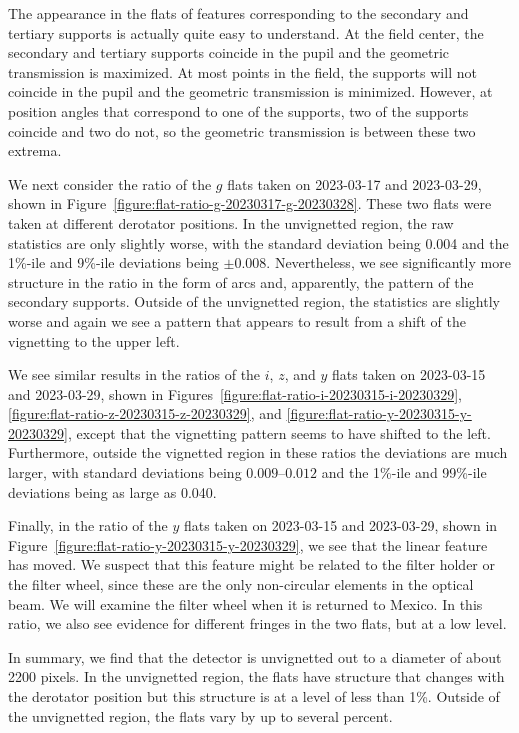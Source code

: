 \documentclass{article}
\begin{document}
The appearance in the flats of features corresponding to the secondary and tertiary supports is actually quite easy to understand. At the field center, the secondary and tertiary supports coincide in the pupil and the geometric transmission is maximized. At most points in the field, the supports will not coincide in the pupil and the geometric transmission is minimized. However, at position angles that correspond to one of the supports, two of the supports coincide and two do not, so the geometric transmission is between these two extrema.

We next consider the ratio of the $g$ flats taken on 2023-03-17 and 2023-03-29, shown in Figure~\ref{figure:flat-ratio-g-20230317-g-20230328}. These two flats were taken at different derotator positions. In the unvignetted region, the raw statistics are only slightly worse, with the standard deviation being 0.004 and the 1\%-ile and 9\%-ile deviations being $\pm0.008$. Nevertheless, we see significantly more structure in the ratio in the form of arcs and, apparently, the pattern of the secondary supports. Outside of the unvignetted region, the statistics are slightly worse and again we see a pattern that appears to result from a shift of the vignetting to the upper left.

We see similar results in the ratios of the $i$, $z$, and $y$ flats taken on 2023-03-15 and 2023-03-29, shown in Figures~\ref{figure:flat-ratio-i-20230315-i-20230329}, \ref{figure:flat-ratio-z-20230315-z-20230329}, and \ref{figure:flat-ratio-y-20230315-y-20230329}, except that the vignetting pattern seems to have shifted to the left. Furthermore, outside the vignetted region in these ratios the deviations are much larger, with standard deviations being $0.009$--$0.012$ and the 1\%-ile and 99\%-ile deviations being as large as 0.040.

Finally, in the ratio of the $y$ flats taken on 2023-03-15 and 2023-03-29, shown in Figure~\ref{figure:flat-ratio-y-20230315-y-20230329}, we see that the linear feature has moved. We suspect that this feature might be related to the filter holder or the filter wheel, since these are the only non-circular elements in the optical beam. We will examine the filter wheel when it is returned to Mexico. In this ratio, we also see evidence for different fringes in the two flats, but at a low level.

In summary, we find that the detector is unvignetted out to a diameter of about 2200 pixels. In the unvignetted region, the flats have structure that changes with the derotator position but this structure is at a level of less than 1\%. Outside of the unvignetted region, the flats vary by up to several percent.
\end{document}
